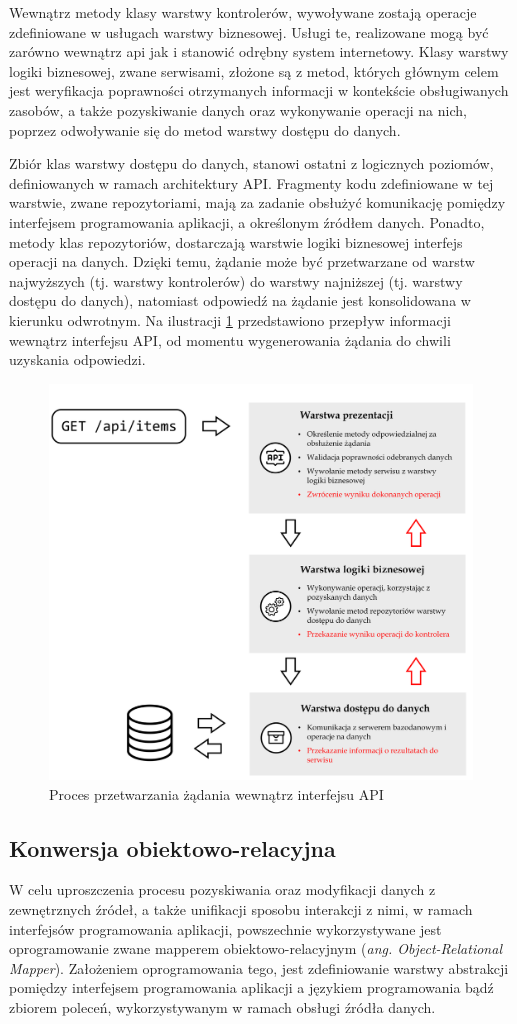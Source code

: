 Wewnątrz metody klasy warstwy kontrolerów, wywoływane zostają operacje zdefiniowane w usługach warstwy biznesowej. Usługi te, realizowane mogą być zarówno wewnątrz api jak i stanowić odrębny system internetowy. Klasy warstwy logiki biznesowej, zwane serwisami, złożone są z metod, których głównym celem jest weryfikacja poprawności otrzymanych informacji w kontekście obsługiwanych zasobów, a także pozyskiwanie danych oraz wykonywanie operacji na nich, poprzez odwoływanie się do metod warstwy dostępu do danych.

Zbiór klas warstwy dostępu do danych, stanowi ostatni z logicznych poziomów, definiowanych w ramach architektury API. Fragmenty kodu zdefiniowane w tej warstwie, zwane repozytoriami, mają za zadanie obsłużyć komunikację pomiędzy interfejsem programowania aplikacji, a określonym źródłem danych. Ponadto, metody klas repozytoriów, dostarczają warstwie logiki biznesowej interfejs operacji na danych. Dzięki temu, żądanie może być przetwarzane od warstw najwyższych (tj. warstwy kontrolerów) do warstwy najniższej (tj. warstwy dostępu do danych), natomiast odpowiedź na żądanie jest konsolidowana w kierunku odwrotnym. Na ilustracji \ref{fig:architektura-api} przedstawiono przepływ informacji wewnątrz interfejsu API, od momentu wygenerowania żądania do chwili uzyskania odpowiedzi.

\begin{figure}[ht]
 \centering
  \includegraphics[width=0.6\linewidth]{rys02/architektura-api}
 \caption{Proces przetwarzania żądania wewnątrz interfejsu API}
 \label{fig:architektura-api}
\end{figure}
 
\subsection*{Konwersja obiektowo-relacyjna}
W celu uproszczenia procesu pozyskiwania oraz modyfikacji danych z zewnętrznych źródeł, a także unifikacji sposobu interakcji z nimi, w ramach interfejsów programowania aplikacji, powszechnie wykorzystywane jest oprogramowanie zwane mapperem obiektowo-relacyjnym (\textit{ang. Object-Relational Mapper}). Założeniem oprogramowania tego, jest zdefiniowanie warstwy abstrakcji pomiędzy interfejsem programowania aplikacji a językiem programowania bądź zbiorem poleceń, wykorzystywanym w ramach obsługi źródła danych.

